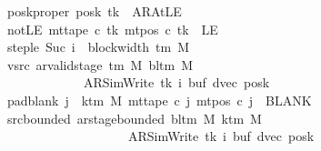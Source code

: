 \begin{isabellebody}
\ \ \ \ \ \ \ poskproper{\isacharcolon}{\kern0pt}\ {\isachardoublequoteopen}posk\ tk\ {\isasymnoteq}\ AR{\isacharunderscore}{\kern0pt}AtLE{\isachardoublequoteclose}\isanewline
\ \ \ \ \ \ \ notLE{\isacharcolon}{\kern0pt}\ {\isachardoublequoteopen}mt{\isacharunderscore}{\kern0pt}tape\ c{\isacharprime}{\kern0pt}\ tk\ {\isacharparenleft}{\kern0pt}mt{\isacharunderscore}{\kern0pt}pos\ c{\isacharprime}{\kern0pt}\ tk{\isacharparenright}{\kern0pt}\ {\isasymnoteq}\ LE{}{\isachardoublequoteclose}\isanewline
\ \ \ \ \ \ \ step{\isacharunderscore}{\kern0pt}le{\isacharcolon}{\kern0pt}\ {\isachardoublequoteopen}Suc\ i\ {\isasymle}\ block{\isacharunderscore}{\kern0pt}width\ {\isacharparenleft}{\kern0pt}{\isasymGamma}{\isacharunderscore}{\kern0pt}tm\ M{\isacharparenright}{\kern0pt}{\isachardoublequoteclose}\isanewline
\ \ \ \ \ \ \ vsrc{\isacharcolon}{\kern0pt}\ {\isachardoublequoteopen}ar{\isacharunderscore}{\kern0pt}valid{\isacharunderscore}{\kern0pt}stage\ {\isacharparenleft}{\kern0pt}{\isasymGamma}{\isacharunderscore}{\kern0pt}tm\ M{\isacharparenright}{\kern0pt}\ {\isacharparenleft}{\kern0pt}bl{\isacharunderscore}{\kern0pt}tm\ M{\isacharparenright}{\kern0pt}\isanewline
\ \ \ \ \ \ \ \ \ \ \ \ \ \ \ \ \ \ \ {\isacharparenleft}{\kern0pt}AR{\isacharunderscore}{\kern0pt}SimWrite{\isacharcomma}{\kern0pt}\ tk{\isacharcomma}{\kern0pt}\ i{\isacharcomma}{\kern0pt}\ buf{\isacharcomma}{\kern0pt}\ dvec{\isacharcomma}{\kern0pt}\ posk{\isacharparenright}{\kern0pt}{\isachardoublequoteclose}\isanewline
\ \ \ \ \ \ \ pad{\isacharunderscore}{\kern0pt}blank{\isacharcolon}{\kern0pt}\ {\isachardoublequoteopen}{\isasymforall}j\ {\isasymge}\ k{\isacharunderscore}{\kern0pt}tm\ M{\isachardot}{\kern0pt}\ mt{\isacharunderscore}{\kern0pt}tape\ c{\isacharprime}{\kern0pt}\ j\ {\isacharparenleft}{\kern0pt}mt{\isacharunderscore}{\kern0pt}pos\ c{\isacharprime}{\kern0pt}\ j{\isacharparenright}{\kern0pt}\ {\isacharequal}{\kern0pt}\ BLANK{}{\isachardoublequoteclose}\isanewline
\ \ \ \ \ \ \ src{\isacharunderscore}{\kern0pt}bounded{\isacharcolon}{\kern0pt}\ {\isachardoublequoteopen}ar{\isacharunderscore}{\kern0pt}stage{\isacharunderscore}{\kern0pt}bounded\ {\isacharparenleft}{\kern0pt}bl{\isacharunderscore}{\kern0pt}tm\ M{\isacharparenright}{\kern0pt}\ {\isacharparenleft}{\kern0pt}k{\isacharunderscore}{\kern0pt}tm\ M{\isacharparenright}{\kern0pt}\isanewline
\ \ \ \ \ \ \ \ \ \ \ \ \ \ \ \ \ \ \ \ \ \ \ \ \ \ {\isacharparenleft}{\kern0pt}AR{\isacharunderscore}{\kern0pt}SimWrite{\isacharcomma}{\kern0pt}\ tk{\isacharcomma}{\kern0pt}\ i{\isacharcomma}{\kern0pt}\ buf{\isacharcomma}{\kern0pt}\ dvec{\isacharcomma}{\kern0pt}\ posk{\isacharparenright}{\kern0pt}{\isachardoublequoteclose}\isanewline

\end{isabellebody}
